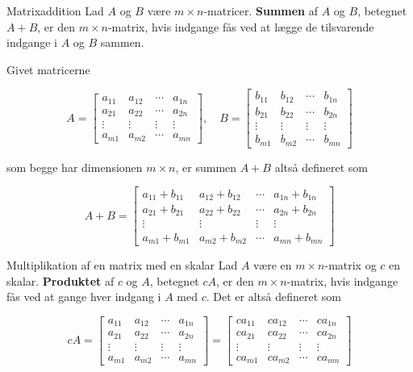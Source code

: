 \begin{definition}{Matrixaddition}
    Lad $A$ og $B$ være $m \times n$-matricer. \textbf{Summen} af $A$ og $B$, betegnet $A + B$, er den $m \times n$-matrix, hvis indgange fås ved at lægge de tilsvarende indgange i $A$ og $B$ sammen.

    Givet matricerne

    $$
    A=\left[\begin{array}{cccc}
    a_{11} & a_{12} & \cdots & a_{1 n} \\
    a_{21} & a_{22} & \cdots & a_{2 n} \\
    \vdots & \vdots & \vdots & \vdots \\
    a_{m 1} & a_{m 2} & \cdots & a_{m n}
    \end{array}\right], \quad B=\left[\begin{array}{cccc}
    b_{11} & b_{12} & \cdots & b_{1 n} \\
    b_{21} & b_{22} & \cdots & b_{2 n} \\
    \vdots & \vdots & \vdots & \vdots \\
    b_{m 1} & b_{m 2} & \cdots & b_{m n}
    \end{array}\right]
    $$

    som begge har dimensionen $m \times n$, er summen $A+B$ altså defineret som

    $$
    A+B=\left[\begin{array}{cccc}
    a_{11}+b_{11} & a_{12}+b_{12} & \cdots & a_{1 n}+b_{1 n} \\
    a_{21}+b_{21} & a_{22}+b_{22} & \cdots & a_{2 n}+b_{2 n} \\
    \vdots & \vdots & \vdots & \vdots \\
    a_{m 1}+b_{m 1} & a_{m 2}+b_{m 2} & \cdots & a_{m n}+b_{m n}
    \end{array}\right]
    $$
\end{definition}

\begin{definition}{Multiplikation af en matrix med en skalar}
    Lad $A$ være en $m \times n$-matrix og $c$ en skalar. \textbf{Produktet} af $c$ og $A$, betegnet $cA$, er den $m \times n$-matrix, hvis indgange fås ved at gange hver indgang i $A$ med $c$. Det er altså defineret som

    $$
    c A=\left[\begin{array}{cccc}
    a_{11} & a_{12} & \cdots & a_{1 n} \\
    a_{21} & a_{22} & \cdots & a_{2 n} \\
    \vdots & \vdots & \vdots & \vdots \\
    a_{m 1} & a_{m 2} & \cdots & a_{m n}
    \end{array}\right] = \left[\begin{array}{cccc}
    c a_{11} & c a_{12} & \cdots & c a_{1 n} \\
    c a_{21} & c a_{22} & \cdots & c a_{2 n} \\
    \vdots & \vdots & \vdots & \vdots \\
    c a_{m 1} & c a_{m 2} & \cdots & c a_{m n}
    \end{array}\right]
    $$
    
\end{definition}

